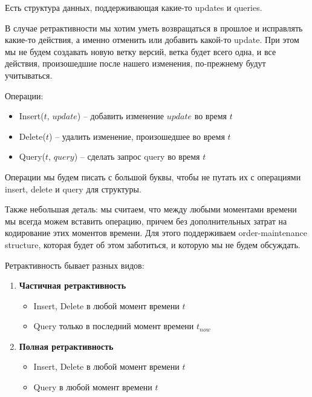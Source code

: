 Есть структура данных, поддерживающая какие-то updates и queries.

В случае ретрактивности мы хотим уметь возвращаться в прошлое и исправлять какие-то действия, а именно отменить или добавить какой-то update.
При этом мы не будем создавать новую ветку версий, ветка будет всего одна, и все действия, произошедшие после нашего изменения, по-прежнему будут учитываться.

Операции:

\begin{itemize}

\item Insert($t$, $update$) -- добавить изменение $update$ во время $t$
\item Delete($t$) -- удалить изменение, произошедшее во время $t$
\item Query($t$, $query$) -- сделать запрос query во время $t$

\end{itemize}

Операции мы будем писать с большой буквы, чтобы не путать их с операциями insert, delete и query для структуры.

Также небольшая деталь: мы считаем, что между любыми моментами времени мы всегда можем вставить операцию, причем без дополнительных затрат на кодирование этих моментов времени.
Для этого поддерживаем order-maintenance structure, которая будет об этом заботиться, и которую мы не будем обсуждать.

Ретрактивность бывает разных видов:

\begin{enumerate}

\item {\bf Частичная ретрактивность}

\begin{itemize}

\item Insert, Delete в любой момент времени $t$
\item Query только в последний момент времени $t_{now}$

\end{itemize}

\item {\bf Полная ретрактивность}

\begin{itemize}

\item Insert, Delete в любой момент времени $t$
\item Query в любой момент времени $t$

\end{itemize}

\end{enumerate}

